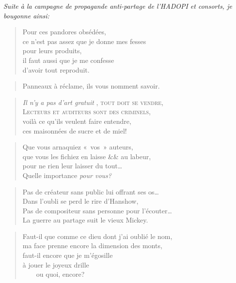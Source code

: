   \textit{Suite à la campagne de propagande anti-partage de l’\textsc{HADOPI} et consorts, je bougonne ainsi:}
  \begin{verse}
    Pour ces pandores obsédées,\\
    ce n’est pas assez que je donne mes fesses\\
    pour leurs produits,\\
    il faut aussi que je me confesse\\
    d’avoir tout reproduit.
  \end{verse}
  \begin{verse}
      Panneaux à réclame, ils vous nomment savoir.
  \end{verse}
  \begin{verse}
    \textit{Il n’y a pas d’art gratuit} , \textsc{tout doit se vendre},\\
    \textsc{Lecteurs et auditeurs sont des criminels},\\
    voilà ce qu’ils veulent faire entendre,\\
    ces maisonnées de sucre et de miel!
  \end{verse}
  \begin{verse}
    Que vous arnaquiez «~vos~» auteurs,\\
    que vous les fichiez en laisse \&\& au labeur,\\
    pour ne rien leur laisser du tout…\\
    Quelle importance \emph{pour vous?}
  \end{verse}
  \begin{verse}
    Pas de créateur sans public lui offrant ses os…\\
    Dans l’oubli se perd le rire d’Hanshow,\\
    Pas de compositeur sans personne pour l’écouter…\\
    La guerre au partage suit le vieux Mickey.
  \end{verse}
  \begin{verse}
    Faut-il que comme ce dieu dont j’ai oublié le nom,\\
    ma face prenne encore la dimension des monts,\\
    faut-il encore que je m’égosille\\
    à jouer le joyeux drille\\
    ~~~~ou quoi, encore?
  \end{verse}
